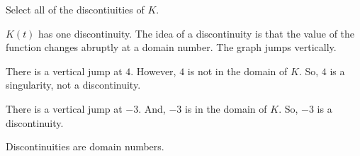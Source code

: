 \documentclass{ximera}
\begin{document}
\begin{example}
Select all of the discontiuities of $K$.
\begin{selectAll}
\end{selectAll}





$K(t)$ has one discontinuity.  The idea of a discontinuity is that the value of the function changes abruptly at a domain number.  The graph jumps vertically.  

There is a vertical jump at $4$. However, $4$ is not in the domain of $K$.  So, $4$ is a singularity, not a discontinuity.  


There is a vertical jump at $-3$. And, $-3$ is  in the domain of $K$.  So, $-3$ is a discontinuity.  

\end{example}


Discontinuities are domain numbers. 
\end{document}

